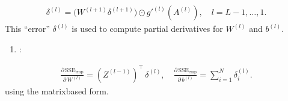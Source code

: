 \documentclass[letterpaper,10pt,english]{jupyterBook}
\begin{document}
\begin{equation*}
\begin{split}
\delta^{(l)} = \bigl(W^{(l+1)} \delta^{(l+1)}\bigr) \odot g'^{(l)}(A^{(l)}), \quad l = L-1,\ldots,1.
\end{split}
\end{equation*}
\sphinxAtStartPar
This “error” \(\delta^{(l)}\) is used to compute partial derivatives for \(W^{(l)}\) and \(b^{(l)}\).
\begin{enumerate}
%
\setcounter{enumi}{2}
\item {} 
\sphinxAtStartPar
{}:

\end{enumerate}
\begin{equation*}
\begin{split}
\frac{\partial\,\mathrm{SSE}_{\mathrm{emp}}}{\partial\,W^{(l)}} = (Z^{(l-1)})^\top \,\delta^{(l)},\quad
\frac{\partial\,\mathrm{SSE}_{\mathrm{emp}}}{\partial\,b^{(l)}} = \sum_{i=1}^{N} \delta^{(l)}_i.
\end{split}
\end{equation*}
\sphinxAtStartPar
using the matrix\sphinxhyphen{}based form.
\end{document}
